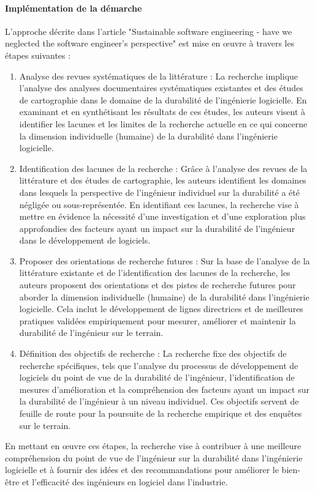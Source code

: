 \paragraph{Implémentation de la démarche}
L'approche décrite dans l'article "Sustainable software engineering - have we neglected the software engineer's perspective" est mise en œuvre à travers les étapes suivantes :
\begin{enumerate}
    \item Analyse des revues systématiques de la littérature : La recherche implique l'analyse des analyses documentaires systématiques existantes et des études de cartographie dans le domaine de la durabilité de l'ingénierie logicielle. En examinant et en synthétisant les résultats de ces études, les auteurs visent à identifier les lacunes et les limites de la recherche actuelle en ce qui concerne la dimension individuelle (humaine) de la durabilité dans l'ingénierie logicielle.
    \item Identification des lacunes de la recherche : Grâce à l'analyse des revues de la littérature et des études de cartographie, les auteurs identifient les domaines dans lesquels la perspective de l'ingénieur individuel sur la durabilité a été négligée ou sous-représentée. En identifiant ces lacunes, la recherche vise à mettre en évidence la nécessité d'une investigation et d'une exploration plus approfondies des facteurs ayant un impact sur la durabilité de l'ingénieur dans le développement de logiciels.
    \item Proposer des orientations de recherche futures : Sur la base de l'analyse de la littérature existante et de l'identification des lacunes de la recherche, les auteurs proposent des orientations et des pistes de recherche futures pour aborder la dimension individuelle (humaine) de la durabilité dans l'ingénierie logicielle. Cela inclut le développement de lignes directrices et de meilleures pratiques validées empiriquement pour mesurer, améliorer et maintenir la durabilité de l'ingénieur sur le terrain.
    \item Définition des objectifs de recherche : La recherche fixe des objectifs de recherche spécifiques, tels que l'analyse du processus de développement de logiciels du point de vue de la durabilité de l'ingénieur, l'identification de mesures d'amélioration et la compréhension des facteurs ayant un impact sur la durabilité de l'ingénieur à un niveau individuel. Ces objectifs servent de feuille de route pour la poursuite de la recherche empirique et des enquêtes sur le terrain.
\end{enumerate}
En mettant en œuvre ces étapes, la recherche vise à contribuer à une meilleure compréhension du point de vue de l'ingénieur sur la durabilité dans l'ingénierie logicielle et à fournir des idées et des recommandations pour améliorer le bien-être et l'efficacité des ingénieurs en logiciel dans l'industrie.


